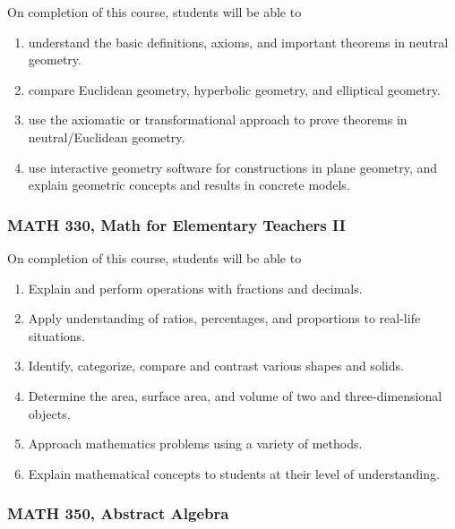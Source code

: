 \documentclass[11pt]{article}
\newenvironment{alphalist}{
\begin{enumerate}[label=(\arabic*),widest=107 ,leftmargin=25pt, itemsep=0pt]}
{\end{enumerate}}
\begin{document}
On completion of this course, students will be able to
\begin{alphalist}
    \item understand the basic definitions, axioms, and important theorems in neutral geometry.
    \item compare Euclidean geometry, hyperbolic geometry, and elliptical geometry.
    \item use the axiomatic or transformational approach to prove theorems in neutral/Euclidean geometry.
    \item use interactive geometry software for constructions in plane geometry, and
    explain geometric concepts and results in concrete models.
\end{alphalist}

\subsubsection*{MATH 330, Math for Elementary Teachers II}

On completion of this course, students will be able to
\begin{alphalist}
\item Explain and perform operations with fractions and decimals. 
\item Apply understanding of ratios, percentages, and proportions to real-life situations. 
\item Identify, categorize, compare and contrast various shapes and solids. 
\item Determine the area, surface area, and volume of two and three-dimensional objects. 
\item Approach mathematics problems using a variety of methods. 
\item Explain mathematical concepts to students at their level of understanding.
\end{alphalist}

\subsubsection*{MATH 350,  Abstract Algebra}
\end{document}
